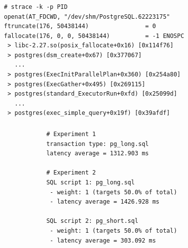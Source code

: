 \documentclass[usenames,dvipsnames, 18pt, compress, aspectratio=169]{beamer}
\begin{document}
\begin{frame}[fragile]{}
    \frametitle{}
    \begin{center}

        \begin{verbatim}
# strace -k -p PID
openat(AT_FDCWD, "/dev/shm/PostgreSQL.62223175"
ftruncate(176, 50438144)                = 0
fallocate(176, 0, 0, 50438144)          = -1 ENOSPC
 > libc-2.27.so(posix_fallocate+0x16) [0x114f76]
 > postgres(dsm_create+0x67) [0x377067]
   ...
 > postgres(ExecInitParallelPlan+0x360) [0x254a80]
 > postgres(ExecGather+0x495) [0x269115]
 > postgres(standard_ExecutorRun+0xfd) [0x25099d]
   ...
 > postgres(exec_simple_query+0x19f) [0x39afdf]
        \end{verbatim}

    \end{center}
\end{frame}

\begin{frame}[fragile]{}
    \frametitle{}
    \begin{center}

        \begin{verbatim}
            # Experiment 1
            transaction type: pg_long.sql
            latency average = 1312.903 ms

            # Experiment 2
            SQL script 1: pg_long.sql
             - weight: 1 (targets 50.0% of total)
             - latency average = 1426.928 ms

            SQL script 2: pg_short.sql
             - weight: 1 (targets 50.0% of total)
             - latency average = 303.092 ms
        \end{verbatim}

    \end{center}
\end{frame}
\end{document}
